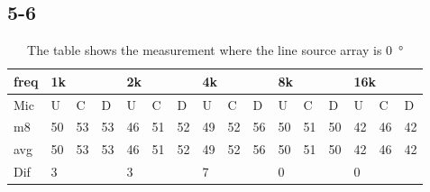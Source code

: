 



\subsection{5-6}


\begin{table}[H]
\centering
\caption{The table shows the measurement where the line source array is \SI{0}{\degree}}
\begin{tabular}{l|l|l|l|l|l|l|l|l|l|l|l|l|lll}
freq & \multicolumn{3}{l|}{1k} & \multicolumn{3}{l|}{2k} & \multicolumn{3}{l|}{4k} & \multicolumn{3}{l|}{8k} & \multicolumn{3}{l}{16k}                                \\ \hline
Mic  & U      & C      & D     & U      & C      & D     & U      & C      & D     & U      & C      & D     & \multicolumn{1}{l|}{U}  & \multicolumn{1}{l|}{C}  & D  \\ \hline
m8   & 50     & 53     & 53    & 46     & 51     & 52    & 49     & 52     & 56    & 50     & 51     & 50    & \multicolumn{1}{l|}{42} & \multicolumn{1}{l|}{46} & 42 \\ \hline
avg & 50     & 53     & 53    & 46     & 51     & 52    & 49     & 52     & 56    & 50     & 51     & 50    & \multicolumn{1}{l|}{42} & \multicolumn{1}{l|}{46} & 42 \\ \hline  
Dif & \multicolumn{3}{l|}{3} & \multicolumn{3}{l|}{3} & \multicolumn{3}{l|}{7} & \multicolumn{3}{l|}{0} & \multicolumn{3}{l}{0}                                
\end{tabular}
\end{table}


